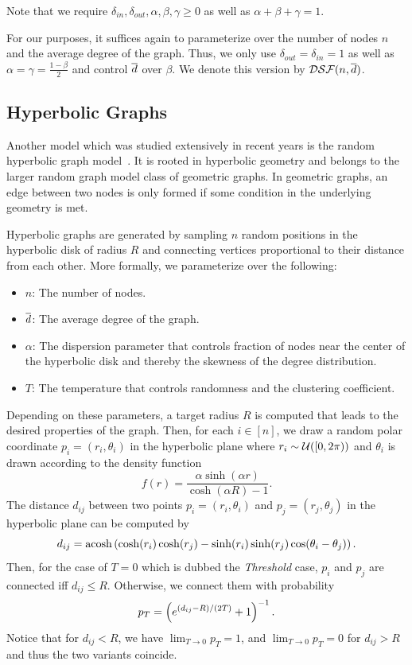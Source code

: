 Note that we require $\delta_{in}, \delta_{out}, \alpha, \beta, \gamma \geq 0$ as well as $\alpha + \beta + \gamma = 1$.

\noindent For our purposes, it suffices again to parameterize over the number of nodes $n$ and the average degree \degavg of the graph.
Thus, we only use $\delta_{out} = \delta_{in} = 1$ as well as $\alpha = \gamma = \frac{1 - \beta}{2}$ and control $\overline{d}$ over $\beta$.
We denote this version by $\mathcal{DSF}(n, \overline{d})$.


\subsection{Hyperbolic Graphs}\label{sec:rhg}
Another  model which was studied extensively in recent years is the random hyperbolic graph model~\cite{gen/rhg, DBLP:journals/talg/BlasiusFFKMT22, DBLP:journals/corr/LoozOLM16, HyperGen, DBLP:journals/corr/abs-1905-06706}.
It is rooted in hyperbolic geometry and belongs to the larger random graph model class of geometric graphs. 
In geometric graphs, an edge between two nodes is only formed if some condition in the underlying geometry is met.

Hyperbolic graphs are generated by sampling $n$ random positions in the hyperbolic disk of radius $R$ and connecting vertices proportional to their distance from each other.
More formally, we parameterize over the following:
\begin{itemize}
  \item $n$: The number of nodes.
  \item $\overline{d}$: The average degree of the graph.
  \item $\alpha$: The dispersion parameter that controls fraction of nodes near the center of the hyperbolic disk and thereby the skewness of the degree distribution.
  \item $T$: The temperature that controls randomness and the clustering coefficient.
\end{itemize}
Depending on these parameters, a target radius $R$ is computed that leads to the desired properties of the graph.
Then, for each $i \in [n]$, we draw a random polar coordinate $p_i = (r_i, \theta_i)$ in the hyperbolic plane where $r_i\sim\mathcal U([0, 2\pi))$ and $\theta_i$ is drawn according to the density function \[
  f(r) = \frac{\alpha\sinh(\alpha r)}{\cosh(\alpha R) - 1}.
\]
The distance $d_{ij}$ between two points $p_i = (r_i, \theta_i)$ and $p_j = (r_j, \theta_j)$ in the hyperbolic plane can be computed by \[
  d_{ij} = \operatorname{acosh}\left(\cosh(r_i)\cosh(r_j) - \sinh(r_i)\sinh(r_j)\cos(\theta_i - \theta_j)\right).
\] 
Then, for the case of $T = 0$ which is dubbed the \emph{Threshold} case, $p_i$ and $p_j$ are connected iff $d_{ij} \leq R$.
Otherwise, we connect them with probability \[
  p_T = \left(e^{(d_{ij} - R) / (2T)} + 1\right)^{-1}.
\]
Notice that for $d_{ij} < R$, we have $\lim_{T \rightarrow 0}p_T = 1$, and $\lim_{T \rightarrow 0}p_T = 0$ for $d_{ij} > R$ and thus the two variants coincide.

